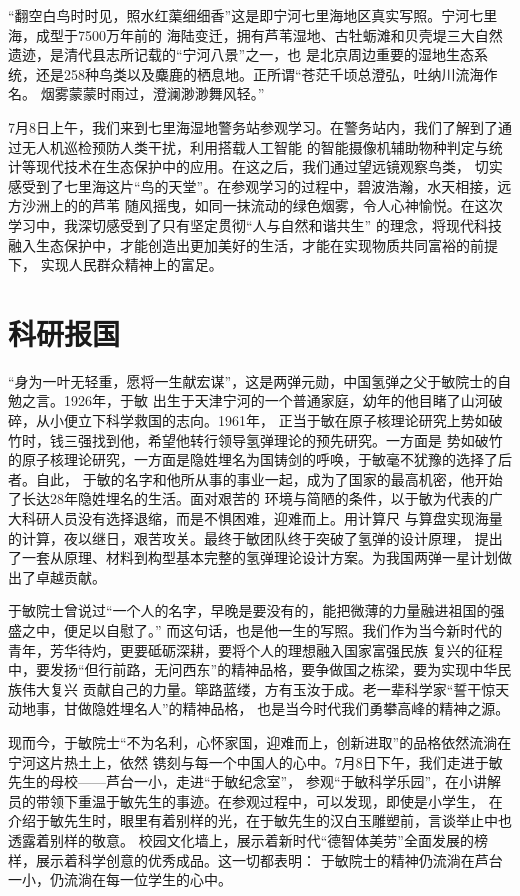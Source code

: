 \documentclass[11pt,a4paper]{ctexart}
\begin{document}

“翻空白鸟时时见，照水红蕖细细香”这是即宁河七里海地区真实写照。宁河七里海，成型于7500万年前的
海陆变迁，拥有芦苇湿地、古牡蛎滩和贝壳堤三大自然遗迹，是清代县志所记载的“宁河八景”之一，也
是北京周边重要的湿地生态系统，还是258种鸟类以及麋鹿的栖息地。正所谓“苍茫千顷总澄弘，吐纳川流海作名。
烟雾蒙蒙时雨过，澄澜渺渺舞风轻。”

7月8日上午，我们来到七里海湿地警务站参观学习。在警务站内，我们了解到了通过无人机巡检预防人类干扰，利用搭载人工智能
的智能摄像机辅助物种判定与统计等现代技术在生态保护中的应用。在这之后，我们通过望远镜观察鸟类，
切实感受到了七里海这片“鸟的天堂”。在参观学习的过程中，碧波浩瀚，水天相接，远方沙洲上的的芦苇
随风摇曳，如同一抹流动的绿色烟雾，令人心神愉悦。在这次学习中，我深切感受到了只有坚定贯彻“人与自然和谐共生”
的理念，将现代科技融入生态保护中，才能创造出更加美好的生活，才能在实现物质共同富裕的前提下，
实现人民群众精神上的富足。

\section{科研报国}

“身为一叶无轻重，愿将一生献宏谋”，这是两弹元勋，中国氢弹之父于敏院士的自勉之言。1926年，于敏
出生于天津宁河的一个普通家庭，幼年的他目睹了山河破碎，从小便立下科学救国的志向。1961年，
正当于敏在原子核理论研究上势如破竹时，钱三强找到他，希望他转行领导氢弹理论的预先研究。一方面是
势如破竹的原子核理论研究，一方面是隐姓埋名为国铸剑的呼唤，于敏毫不犹豫的选择了后者。自此，
于敏的名字和他所从事的事业一起，成为了国家的最高机密，他开始了长达28年隐姓埋名的生活。面对艰苦的
环境与简陋的条件，以于敏为代表的广大科研人员没有选择退缩，而是不惧困难，迎难而上。用计算尺
与算盘实现海量的计算，夜以继日，艰苦攻关。最终于敏团队终于突破了氢弹的设计原理，
提出了一套从原理、材料到构型基本完整的氢弹理论设计方案。为我国两弹一星计划做出了卓越贡献。

于敏院士曾说过“一个人的名字，早晚是要没有的，能把微薄的力量融进祖国的强盛之中，便足以自慰了。”
而这句话，也是他一生的写照。我们作为当今新时代的青年，芳华待灼，更要砥砺深耕，要将个人的理想融入国家富强民族
复兴的征程中，要发扬“但行前路，无问西东”的精神品格，要争做国之栋梁，要为实现中华民族伟大复兴
贡献自己的力量。筚路蓝缕，方有玉汝于成。老一辈科学家“誓干惊天动地事，甘做隐姓埋名人”的精神品格，
也是当今时代我们勇攀高峰的精神之源。

现而今，于敏院士“不为名利，心怀家国，迎难而上，创新进取”的品格依然流淌在宁河这片热土上，依然
镌刻与每一个中国人的心中。7月8日下午，我们走进于敏先生的母校——芦台一小，走进“于敏纪念室”，
参观“于敏科学乐园”，在小讲解员的带领下重温于敏先生的事迹。在参观过程中，可以发现，即使是小学生，
在介绍于敏先生时，眼里有着别样的光，在于敏先生的汉白玉雕塑前，言谈举止中也透露着别样的敬意。
校园文化墙上，展示着新时代“德智体美劳”全面发展的榜样，展示着科学创意的优秀成品。这一切都表明：
于敏院士的精神仍流淌在芦台一小，仍流淌在每一位学生的心中。
\end{document}

